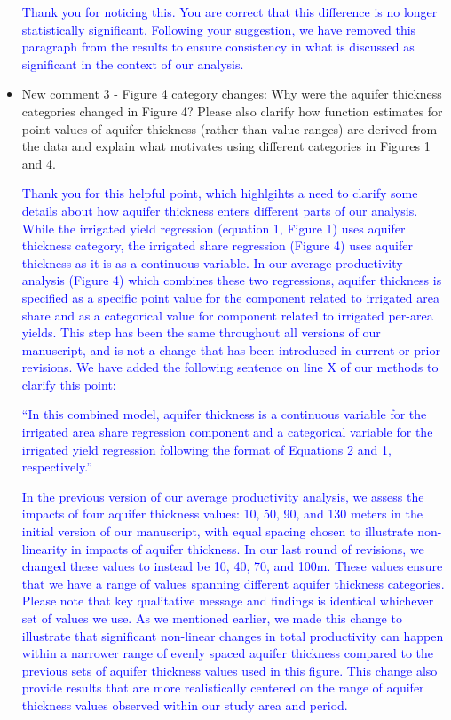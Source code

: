 \documentclass[
]{article}
\begin{document}
\begin{itemize}
    \textcolor{blue}{Thank you for noticing this. You are correct that this difference is no longer statistically significant. Following your suggestion, we have removed this paragraph from the results to ensure consistency in what is discussed as significant in the context of our analysis.}

\item New comment 3 - Figure 4 category changes: Why were the aquifer thickness categories changed in Figure 4? Please also clarify how function estimates for point values of aquifer thickness (rather than value ranges) are derived from the data and explain what motivates using different categories in Figures 1 and 4.


    \textcolor{blue}{Thank you for this helpful point, which highlgihts a need to clarify some details about how aquifer thickness enters different parts of our analysis. While the irrigated yield regression (equation 1, Figure 1) uses aquifer thickness category, the irrigated share regression (Figure 4) uses aquifer thickness as it is as a continuous variable. In our average productivity analysis (Figure 4) which combines these two regressions, aquifer thickness is specified as a specific point value for the component related to irrigated area share and as a categorical value for component related to irrigated per-area yields. This step has been the same throughout all versions of our manuscript, and is not a change that has been introduced in current or prior revisions. We have added the following sentence on line X of our methods to clarify this point:}

    \textcolor{blue}{``In this combined model, aquifer thickness is a continuous variable for the irrigated area share regression component and a categorical variable for the irrigated yield regression following the format of Equations 2 and 1, respectively.''}
    
    \textcolor{blue}{In the previous version of our average productivity analysis, we assess the impacts of four aquifer thickness values: 10, 50, 90, and 130 meters in the initial version of our manuscript, with equal spacing chosen to illustrate non-linearity in impacts of aquifer thickness. In our last round of revisions, we changed these values to instead be 10, 40, 70, and 100m. These values ensure that we have a range of values spanning different aquifer thickness categories. Please note that key qualitative message and findings is identical whichever set of values we use. As we mentioned earlier, we made this change to illustrate that significant non-linear changes in total productivity can happen within a narrower range of evenly spaced aquifer thickness compared to the previous sets of aquifer thickness values used in this figure. This change also provide results that are more realistically centered on the range of aquifer thickness values observed within our study area and period.} 


\end{itemize}
\end{document}
